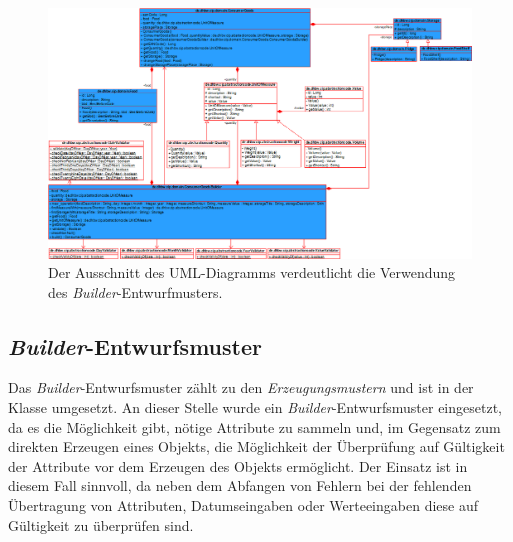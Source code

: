  \begin{figure}[H]
 	\centering
 	\includegraphics[width=1.0\textwidth]{Bilder/uml-diagramme/entwurfsmuster-builder.png}
 	\caption[Ausschnitt des UML-Diagramms zur Darstellung des \textit{Builder}-Entwurfmusters.]{Der Ausschnitt des UML-Diagramms verdeutlicht die Verwendung des \textit{Builder}-Entwurfmusters.}
 	\label{fig:uml-builder-pattern}
 \end{figure}

\subsection*{\textit{Builder}-Entwurfsmuster}
Das \textit{Builder}-Entwurfsmuster zählt zu den \textit{Erzeugungsmustern} und ist in der Klasse \href{https://github.com/lucasmerkel/dhbw-advancedswe-programmentwurf/blob/d5c89113d12c3b877ddc4d6a99225b277ddd468f/swe_programmentwurf/consumergoods-inventory-planner/3-cip-domain/src/main/java/de/dhbw/cip/domain/ConsumerGoods.java#L72}{} umgesetzt.
An dieser Stelle wurde ein \textit{Builder}-Entwurfsmuster eingesetzt, da es die Möglichkeit gibt, nötige Attribute zu sammeln und, im Gegensatz zum direkten Erzeugen eines Objekts, die Möglichkeit der Überprüfung auf Gültigkeit der Attribute vor dem Erzeugen des Objekts ermöglicht.
Der Einsatz ist in diesem Fall sinnvoll, da neben dem Abfangen von Fehlern bei der fehlenden Übertragung von Attributen, Datumseingaben oder Werteeingaben diese auf Gültigkeit zu überprüfen sind.

